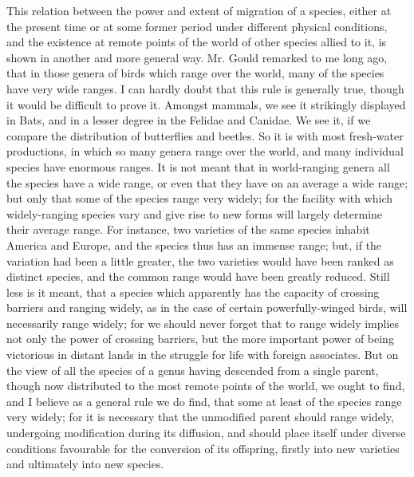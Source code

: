 \indent This relation between the power and extent of migration of a species, either at the present time or at some former period under different physical conditions, and the existence at remote points of the world of other species allied to it, is shown in another and more general way. Mr. Gould remarked to me long ago, that in those genera of birds which range over the world, many of the species have very wide ranges. I can hardly doubt that this rule is generally true, though it would be difficult to prove it. Amongst mammals, we see it strikingly displayed in Bats, and in a lesser degree in the Felidae and Canidae. We see it, if we compare the distribution of butterflies and beetles. So it is with most fresh-water productions, in which so many genera range over the world, and many individual species have enormous ranges. It is not meant that in world-ranging genera all the species have a wide range, or even that they have on an average a wide range; but only that some of the species range very widely; for the facility with which widely-ranging species vary and give rise to new forms will largely determine their average range. For instance, two varieties of the same species inhabit America and Europe, and the species thus has an immense range; but, if the variation had been a little greater, the two varieties would have been ranked as distinct species, and the common range would have been greatly reduced. Still less is it meant, that a species which apparently has the capacity of crossing barriers and ranging widely, as in the case of certain powerfully-winged birds, will necessarily range widely; for we should never forget that to range widely implies not only the power of crossing barriers, but the more important power of being victorious in distant lands in the struggle for life with foreign associates. But on the view of all the species of a genus having descended from a single parent, though now distributed to the most remote points of the world, we ought to find, and I believe as a general rule we do find, that some at least of the species range very widely; for it is necessary that the unmodified parent should range widely, undergoing modification during its diffusion, and should place itself under diverse conditions favourable for the conversion of its offspring, firstly into new varieties and ultimately into new species.~\\
